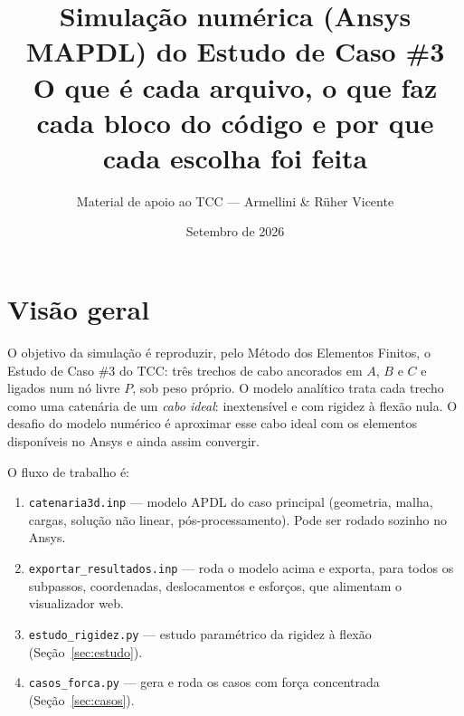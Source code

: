 \documentclass[11pt,a4paper]{article}
\title{\textbf{Simulação numérica (Ansys MAPDL) do Estudo de Caso \#3}\\[4pt]
\large O que é cada arquivo, o que faz cada bloco do código e por que cada escolha foi feita}
\author{Material de apoio ao TCC --- Armellini \& Rüher Vicente}
\date{Setembro de 2026}
\begin{document}
\maketitle
\tableofcontents

\section{Visão geral}

O objetivo da simulação é reproduzir, pelo Método dos Elementos Finitos, o Estudo de Caso \#3 do TCC:
três trechos de cabo ancorados em $A$, $B$ e $C$ e ligados num nó livre $P$, sob peso próprio.
O modelo analítico trata cada trecho como uma catenária de um \emph{cabo ideal}: inextensível e com
rigidez à flexão nula. O desafio do modelo numérico é aproximar esse cabo ideal com os elementos
disponíveis no Ansys e ainda assim convergir.

O fluxo de trabalho é:
\begin{enumerate}[itemsep=2pt]
  \item \texttt{catenaria3d.inp} --- modelo APDL do caso principal (geometria, malha, cargas, solução
        não linear, pós-processamento). Pode ser rodado sozinho no Ansys.
  \item \texttt{exportar\_resultados.inp} --- roda o modelo acima e exporta, para todos os subpassos,
        coordenadas, deslocamentos e esforços, que alimentam o visualizador web.
  \item \texttt{estudo\_rigidez.py} --- estudo paramétrico da rigidez à flexão (Seção~\ref{sec:estudo}).
  \item \texttt{casos\_forca.py} --- gera e roda os casos com força concentrada (Seção~\ref{sec:casos}).
\end{enumerate}
\end{document}
